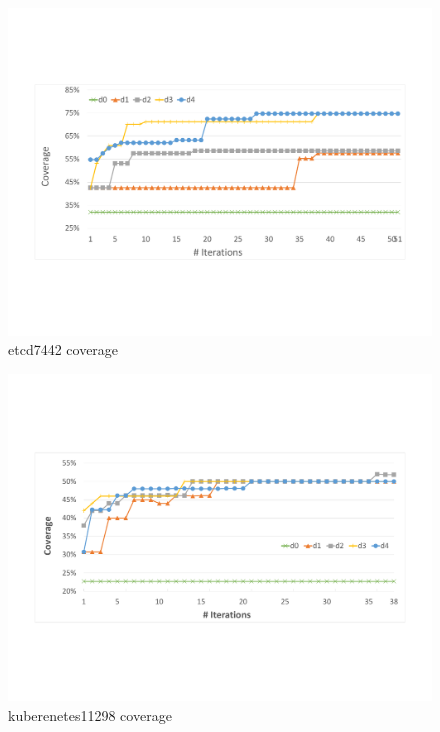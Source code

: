 \begin{figure}
\centering
  \includegraphics[width=.95\linewidth]{figs/coverage_etcd7443.pdf}
  \caption{etcd7442 coverage}
  \label{fig:etcd_coverage}
\end{figure}


\begin{figure}
\centering
  \includegraphics[width=.95\linewidth]{figs/coverage_kubernetes11298.pdf}
  \caption{kuberenetes11298 coverage}
  \label{fig:kubernetes_coverage}
\end{figure}

